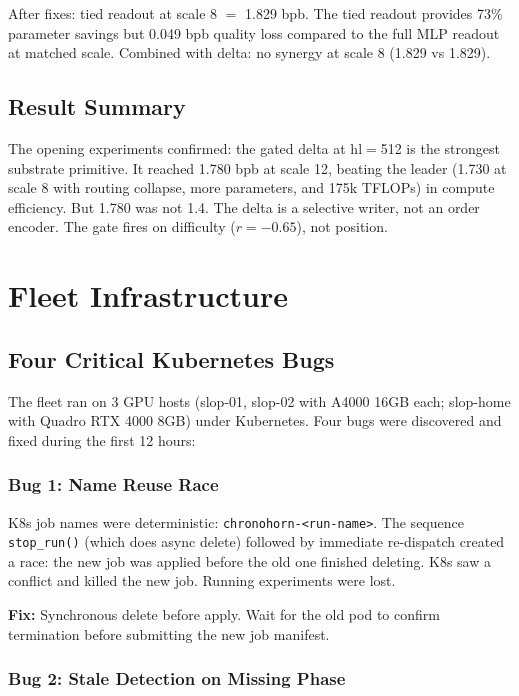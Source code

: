 \documentclass[11pt,a4paper]{report}
\begin{document}
After fixes: tied readout at scale 8 $=$ 1.829 bpb. The tied readout provides 73\% parameter savings but 0.049 bpb quality loss compared to the full MLP readout at matched scale. Combined with delta: no synergy at scale 8 (1.829 vs 1.829).

\section{Result Summary}

The opening experiments confirmed: the gated delta at hl$=$512 is the strongest substrate primitive. It reached 1.780 bpb at scale 12, beating the leader (1.730 at scale 8 with routing collapse, more parameters, and 175k TFLOPs) in compute efficiency. But 1.780 was not 1.4. The delta is a selective writer, not an order encoder. The gate fires on difficulty ($r = -0.65$), not position.


\chapter{Fleet Infrastructure}

\section{Four Critical Kubernetes Bugs}

The fleet ran on 3 GPU hosts (slop-01, slop-02 with A4000 16GB each; slop-home with Quadro RTX 4000 8GB) under Kubernetes. Four bugs were discovered and fixed during the first 12 hours:

\subsection{Bug 1: Name Reuse Race}

K8s job names were deterministic: \texttt{chronohorn-<run-name>}. The sequence \texttt{stop\_run()} (which does async delete) followed by immediate re-dispatch created a race: the new job was applied before the old one finished deleting. K8s saw a conflict and killed the new job. Running experiments were lost.

\textbf{Fix:} Synchronous delete before apply. Wait for the old pod to confirm termination before submitting the new job manifest.

\subsection{Bug 2: Stale Detection on Missing Phase}
\end{document}
